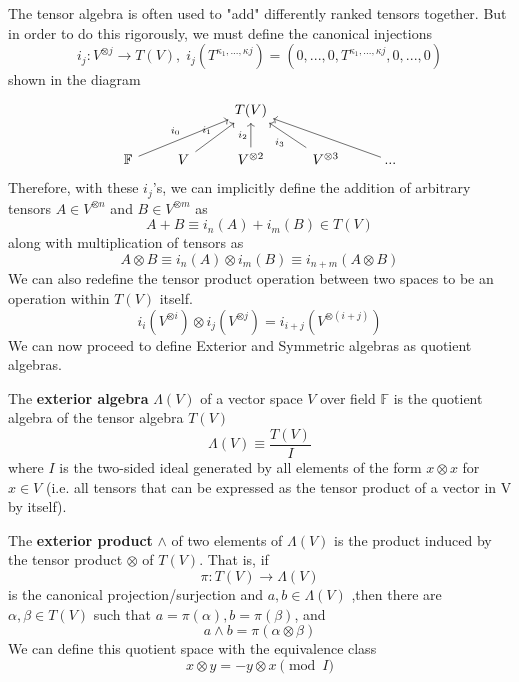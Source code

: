   The tensor algebra is often used to "add" differently ranked tensors together. But in order to do this rigorously, we must define the canonical injections
  \begin{equation}
    i_j: V^{\otimes j} \longrightarrow T(V), \; i_j (T^{\kappa_1, ..., \kappa j}) = (0, ...,0, T^{\kappa_1, ..., \kappa j}, 0, ..., 0) 
  \end{equation}
  shown in the diagram
  \[\begin{tikzcd}
      & & T(V) & & \\
      \mathbb{F} \arrow{urr}{i_0} & V \arrow{ur}{i_1} & V^{\otimes 2} \arrow{u}{i_2} & V^{\otimes 3} \arrow{ul}{i_3} & ... \arrow{ull}
  \end{tikzcd}\]
  Therefore, with these $i_j$'s, we can implicitly define the addition of arbitrary tensors $A \in V^{\otimes n}$ and $B \in V^{\otimes m}$ as 
  \begin{equation}
    A + B \equiv i_n (A) + i_m (B) \in T(V)
  \end{equation}
  along with multiplication of tensors as
  \begin{equation}
    A \otimes B \equiv i_n(A) \otimes i_m(B) \equiv i_{n+m} (A \otimes B)
  \end{equation}
  We can also redefine the tensor product operation between two spaces to be an operation within $T(V)$ itself. 
  \begin{equation}
    i_i(V^{\otimes i}) \otimes i_j( V^{\otimes j}) = i_{i+j} (V^{\otimes (i+j)})
  \end{equation}
  We can now proceed to define Exterior and Symmetric algebras as quotient algebras. 

  \begin{definition}
    The \textbf{exterior algebra} $\Lambda(V)$ of a vector space $V$ over field $\mathbb{F}$ is the quotient algebra of the tensor algebra $T(V)$
    \begin{equation}
      \Lambda(V) \equiv \frac{T(V)}{I}
    \end{equation}
    where $I$ is the two-sided ideal generated by all elements of the form $x \otimes x$ for $x \in V$ (i.e. all tensors that can be expressed as the tensor product of a vector in V by itself). 

    The \textbf{exterior product} $\wedge$ of two elements of $\Lambda(V)$ is the product induced by the tensor product $\otimes$ of $T(V)$. That is, if 
    \begin{equation}
      \pi: T(V) \longrightarrow \Lambda(V)
    \end{equation}
    is the canonical projection/surjection and $a, b \in \Lambda(V)$ ,then there are $\alpha, \beta \in T(V)$ such that $a = \pi(\alpha), b = \pi(\beta)$, and 
    \begin{equation}
      a \wedge b = \pi(\alpha \otimes \beta)
    \end{equation}
    We can define this quotient space with the equivalence class
    \begin{equation}
      x \otimes y = - y \otimes x \pmod{I}
    \end{equation}
  \end{definition}

